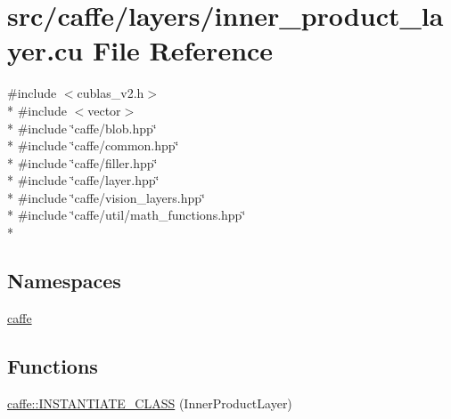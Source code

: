\hypertarget{inner__product__layer_8cu}{\section{src/caffe/layers/inner\+\_\+product\+\_\+layer.cu File Reference}
\label{inner__product__layer_8cu}
}
{\ttfamily \#include $<$cublas\+\_\+v2.\+h$>$}\\*
{\ttfamily \#include $<$vector$>$}\\*
{\ttfamily \#include \char`\"{}caffe/blob.\+hpp\char`\"{}}\\*
{\ttfamily \#include \char`\"{}caffe/common.\+hpp\char`\"{}}\\*
{\ttfamily \#include \char`\"{}caffe/filler.\+hpp\char`\"{}}\\*
{\ttfamily \#include \char`\"{}caffe/layer.\+hpp\char`\"{}}\\*
{\ttfamily \#include \char`\"{}caffe/vision\+\_\+layers.\+hpp\char`\"{}}\\*
{\ttfamily \#include \char`\"{}caffe/util/math\+\_\+functions.\+hpp\char`\"{}}\\*
\subsection*{Namespaces}
\begin{DoxyCompactItemize}
\item 
 \hyperlink{namespacecaffe}{caffe}
\end{DoxyCompactItemize}
\subsection*{Functions}
\begin{DoxyCompactItemize}
\item 
\hyperlink{namespacecaffe_aedabc6751279d7a5619ea66e4818bfcb}{caffe\+::\+I\+N\+S\+T\+A\+N\+T\+I\+A\+T\+E\+\_\+\+C\+L\+A\+S\+S} (Inner\+Product\+Layer)
\end{DoxyCompactItemize}
